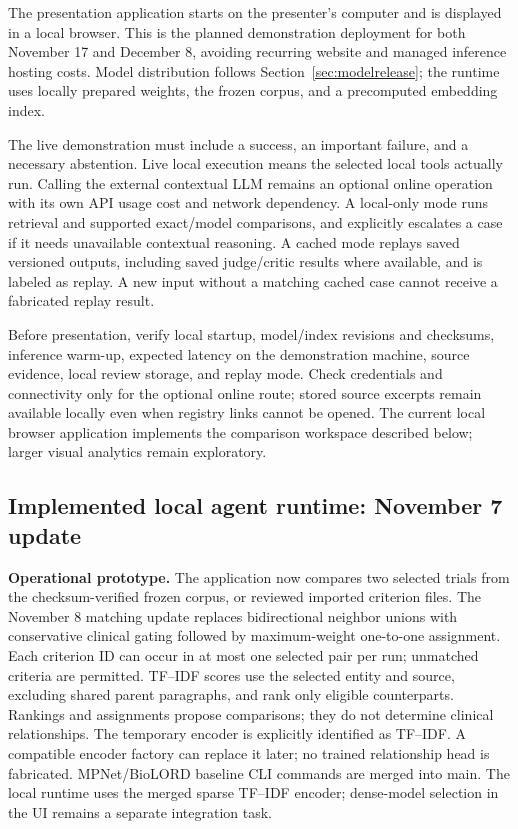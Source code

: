 \documentclass[10pt,letterpaper]{article}
\begin{document}
The presentation application starts on the presenter's computer and is
displayed in a local browser. This is the planned demonstration deployment
for both November 17 and December 8, avoiding recurring website and managed
inference hosting costs. Model distribution follows
Section~\ref{sec:modelrelease}; the runtime uses locally prepared weights,
the frozen corpus, and a precomputed embedding index.

The live demonstration must include a success, an important failure, and a
necessary abstention. Live local execution means the selected local tools
actually run. Calling the external contextual LLM remains an optional online
operation with its own API usage cost and network dependency. A local-only
mode runs retrieval and supported exact/model comparisons, and explicitly
escalates a case if it needs unavailable contextual reasoning. A cached mode
replays saved versioned outputs, including saved judge/critic results where
available, and is labeled as replay. A new input without a matching cached
case cannot receive a fabricated replay result.

Before presentation,
verify local startup, model/index revisions and checksums, inference warm-up,
expected latency on the demonstration machine, source evidence, local review
storage, and replay mode. Check credentials and connectivity only for the
optional online route; stored source excerpts remain available locally even
when registry links cannot be opened. The current local browser application implements the comparison workspace described below; larger visual analytics remain exploratory.

\subsection{Implemented local agent runtime: November 7 update}
\label{sec:workingruntime}
\textbf{Operational prototype.} The application now compares two selected trials
from the checksum-verified frozen corpus, or reviewed imported criterion files.
The November 8 matching update replaces bidirectional neighbor unions with
conservative clinical gating followed by maximum-weight one-to-one assignment.
Each criterion ID can occur in at most one selected pair per run; unmatched
criteria are permitted. TF--IDF scores use the selected entity and source,
excluding shared parent paragraphs, and rank only eligible counterparts.
Rankings and assignments propose comparisons; they do not determine clinical
relationships. The temporary encoder is explicitly identified as
TF--IDF. A compatible encoder factory can replace it later; no trained
relationship head is fabricated. MPNet/BioLORD baseline CLI commands are merged into main. The local runtime
uses the merged sparse TF--IDF encoder; dense-model selection in the UI
remains a separate integration task.
\end{document}
